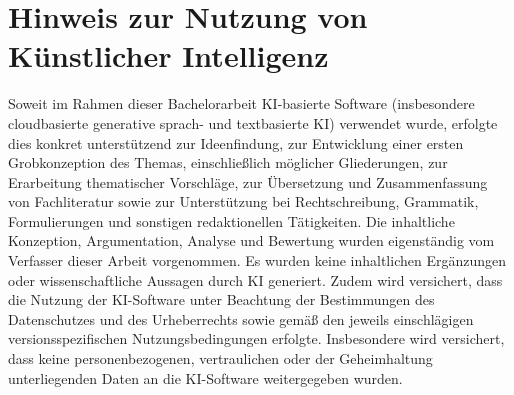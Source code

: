 \clearpage
\thispagestyle{empty}
\chapter*{Hinweis zur Nutzung von Künstlicher Intelligenz}

Soweit im Rahmen dieser Bachelorarbeit KI-basierte Software (insbesondere cloudbasierte generative sprach- und textbasierte KI) verwendet wurde, erfolgte dies konkret unterstützend zur Ideenfindung, zur Entwicklung einer ersten Grobkonzeption des Themas, einschließlich möglicher Gliederungen, zur Erarbeitung thematischer Vorschläge, zur Übersetzung und Zusammenfassung von Fachliteratur sowie zur Unterstützung bei Rechtschreibung, Grammatik, Formulierungen und sonstigen redaktionellen Tätigkeiten. Die inhaltliche Konzeption, Argumentation, Analyse und Bewertung wurden eigenständig vom Verfasser dieser Arbeit vorgenommen. Es wurden keine inhaltlichen Ergänzungen oder wissenschaftliche Aussagen durch KI generiert. Zudem wird versichert, dass die Nutzung der KI-Software unter Beachtung der Bestimmungen des Datenschutzes und des Urheberrechts sowie gemäß den jeweils einschlägigen versionsspezifischen Nutzungsbedingungen erfolgte. Insbesondere wird versichert, dass keine personenbezogenen, vertraulichen oder der Geheimhaltung unterliegenden Daten an die KI-Software weitergegeben wurden.
\clearpage
